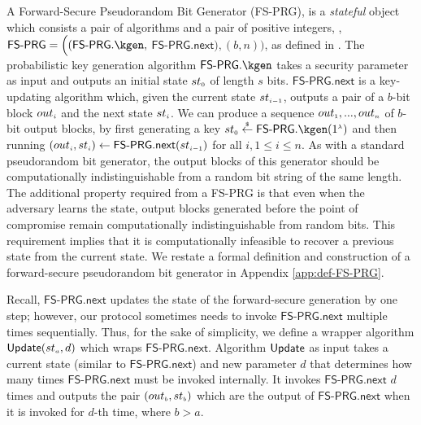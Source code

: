 A Forward-Secure Pseudorandom Bit Generator (FS-PRG), is a \emph{stateful} object which consists a pair of algorithms and a pair of positive integers, \ie, $\mathsf{FS\text{-}PRG} = \Big((\mathsf{FS\text{-}PRG}.\kgen, $ $ \mathsf{FS\text{-}PRG.next}),( b, n)\Big)$, as defined in \cite{BellareY03}.  The probabilistic key generation algorithm $\mathsf{FS\text{-}PRG}.\kgen$ takes a security parameter as input and outputs an initial state ${st}_{\scriptscriptstyle 0}$ of length $s$ bits. $\mathsf{FS\text{-}PRG.next}$ is a key-updating algorithm which, given the current state ${st}_{\scriptscriptstyle i-1}$, outputs a pair of a $b$-bit block ${out}_{\scriptscriptstyle i}$ and the next state ${st}_{\scriptscriptstyle i}$. We can produce a sequence  ${out}_{\scriptscriptstyle 1},..., {out}_{\scriptscriptstyle n}$  of  $b$-bit output blocks, by first generating a key  ${st}_{\sss 0}\stackrel{\sss \$}\leftarrow\mathsf{FS\text{-}PRG}.\kgen(1^{\sss \lambda})$ and then running $({out}_{\scriptscriptstyle i}, st_{\scriptscriptstyle i})\leftarrow  \mathsf{FS\text{-}PRG.next} (st_{\scriptscriptstyle i-1})$ for all $i, 1\leq i\leq n$. As with a standard pseudorandom bit generator, the output blocks of this generator should be computationally indistinguishable from a random bit
string of the same length. The additional property required from a
FS-PRG is that even when the
adversary learns the state, output blocks generated before the point of
compromise remain computationally indistinguishable from random bits.
This requirement implies that it is computationally infeasible to
recover a previous state from the current state. We restate a formal definition and construction of a forward-secure pseudorandom bit generator in Appendix \ref{app:def-FS-PRG}. 


Recall, $\mathsf{FS\text{-}PRG.next}$ updates the state of the forward-secure generation by one step; however, our protocol sometimes needs to invoke $\mathsf{FS\text{-}PRG.next}$ multiple times sequentially. Thus, for the sake of simplicity, we define a wrapper algorithm $ \mathsf{Update}({st}_{\scriptscriptstyle a}, d)$ which wraps  $\mathsf{FS\text{-}PRG.next}$. Algorithm $\mathsf{Update}$  as input takes a current state (similar to $\mathsf{FS\text{-}PRG.next}$) and new parameter $d$ that determines how many times   $\mathsf{FS\text{-}PRG.next}$ must be invoked internally. It invokes  $\mathsf{FS\text{-}PRG.next}$ $d$ times and outputs the pair  $({out}_{\scriptscriptstyle b}, {st}_{\scriptscriptstyle b})$  which are the output of $\mathsf{FS\text{-}PRG.next}$ when it is invoked for $d$-th time, where $ b> a$. 





